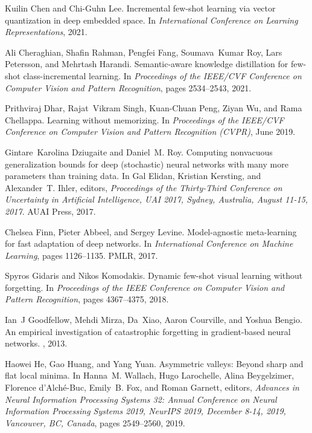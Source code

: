 \documentclass{article}
\begin{document}
\begin{thebibliography}{10}
Kuilin Chen and Chi-Guhn Lee.
\newblock Incremental few-shot learning via vector quantization in deep
  embedded space.
\newblock In {\em International Conference on Learning Representations}, 2021.

Ali Cheraghian, Shafin Rahman, Pengfei Fang, Soumava~Kumar Roy, Lars Petersson,
  and Mehrtash Harandi.
\newblock Semantic-aware knowledge distillation for few-shot class-incremental
  learning.
\newblock In {\em Proceedings of the IEEE/CVF Conference on Computer Vision and
  Pattern Recognition}, pages 2534--2543, 2021.

Prithviraj Dhar, Rajat~Vikram Singh, Kuan-Chuan Peng, Ziyan Wu, and Rama
  Chellappa.
\newblock Learning without memorizing.
\newblock In {\em Proceedings of the IEEE/CVF Conference on Computer Vision and
  Pattern Recognition (CVPR)}, June 2019.

Gintare~Karolina Dziugaite and Daniel~M. Roy.
\newblock Computing nonvacuous generalization bounds for deep (stochastic)
  neural networks with many more parameters than training data.
\newblock In Gal Elidan, Kristian Kersting, and Alexander~T. Ihler, editors,
  {\em Proceedings of the Thirty-Third Conference on Uncertainty in Artificial
  Intelligence, {UAI} 2017, Sydney, Australia, August 11-15, 2017}. {AUAI}
  Press, 2017.

Chelsea Finn, Pieter Abbeel, and Sergey Levine.
\newblock Model-agnostic meta-learning for fast adaptation of deep networks.
\newblock In {\em International Conference on Machine Learning}, pages
  1126--1135. PMLR, 2017.

Spyros Gidaris and Nikos Komodakis.
\newblock Dynamic few-shot visual learning without forgetting.
\newblock In {\em Proceedings of the IEEE Conference on Computer Vision and
  Pattern Recognition}, pages 4367--4375, 2018.

Ian~J Goodfellow, Mehdi Mirza, Da~Xiao, Aaron Courville, and Yoshua Bengio.
\newblock An empirical investigation of catastrophic forgetting in
  gradient-based neural networks.
, 2013.

Haowei He, Gao Huang, and Yang Yuan.
\newblock Asymmetric valleys: Beyond sharp and flat local minima.
\newblock In Hanna~M. Wallach, Hugo Larochelle, Alina Beygelzimer, Florence
  d'Alch{\'{e}}{-}Buc, Emily~B. Fox, and Roman Garnett, editors, {\em Advances
  in Neural Information Processing Systems 32: Annual Conference on Neural
  Information Processing Systems 2019, NeurIPS 2019, December 8-14, 2019,
  Vancouver, BC, Canada}, pages 2549--2560, 2019.


\end{thebibliography}
\end{document}
